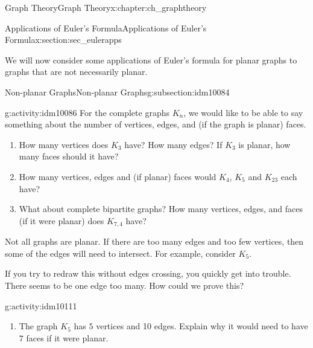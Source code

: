 \documentclass[oneside,10pt,]{book}
\numberwithin{equation}{chapter}
\newcommand{\vtx}[2]{node[fill,circle,inner sep=0pt, minimum size=4pt,label=#1:#2]{}}
\renewcommand{\v}{\vtx{above}{}}
\begin{document}
\begin{chapterptx}{Graph Theory}{}{Graph Theory}{}{}{x:chapter:ch_graphtheory}
\begin{sectionptx}{Applications of Euler's Formula}{}{Applications of Euler's Formula}{}{}{x:section:sec_eulerapps}
\begin{introduction}{}%
We will now consider some applications of Euler's formula for planar graphs to graphs that are not necessarily planar.%
\end{introduction}%
%
%
\typeout{************************************************}
\typeout{************************************************}
%
\begin{subsectionptx}{Non-planar Graphs}{}{Non-planar Graphs}{}{}{g:subsection:idm10084}
\begin{activity}{}{g:activity:idm10086}%
For the complete graphs \(K_n\), we would like to be able to say something about the number of vertices, edges, and (if the graph is planar) faces.%
\begin{enumerate}[font=\bfseries,label=(\alph*),ref=\alph*]
\item{}How many vertices does \(K_3\) have? How many edges?  If \(K_3\) is planar, how many faces should it have?%
\item{}How many vertices, edges and (if planar) faces would \(K_4\), \(K_5\) and \(K_{23}\) each have?%
\item{}What about complete bipartite graphs? How many vertices, edges, and faces (if it were planar) does \(K_{7,4}\) have?%
\end{enumerate}
\end{activity}
Not all graphs are planar. If there are too many edges and too few vertices, then some of the edges will need to intersect. For example, consider \(K_5\).%
\begin{sidebyside}{1}{0.4}{0.4}{0}%
\begin{sbspanel}{0.2}%
\resizebox{\linewidth}{!}{%
\begin{tikzpicture}
          \foreach \x in {0,...,4}
          \draw (\x*72+18:1) \v -- (\x*72+90:1) -- (\x*72-54:1);
        \end{tikzpicture}
}%
\end{sbspanel}%
\end{sidebyside}%
\par
If you try to redraw this without edges crossing, you quickly get into trouble. There seems to be one edge too many. How could we prove this?%
\begin{activity}{}{g:activity:idm10111}%
\begin{enumerate}[font=\bfseries,label=(\alph*),ref=\alph*]
\item{}The graph \(K_5\) has \(5\) vertices and 10 edges.  Explain why it would need to have \(7\) faces if it were planar.%

\end{enumerate}
\end{activity}
\end{subsectionptx}
\end{sectionptx}
\end{chapterptx}
\end{document}
